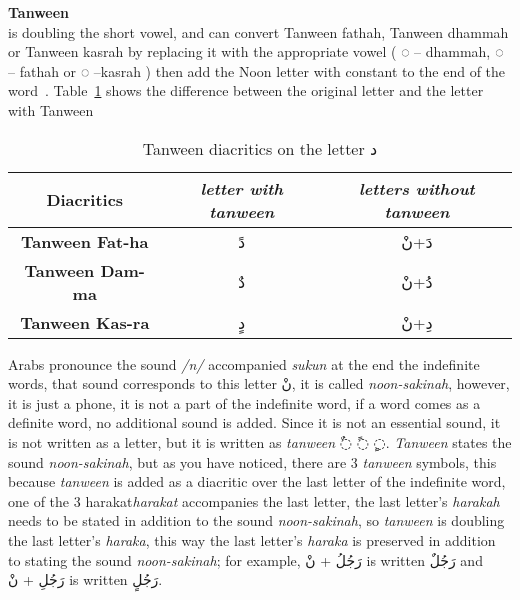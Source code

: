 \begin{definition}\label{def:tanween_definition}
  \textbf{Tanween} \hfill \\
  is doubling the short vowel, and can convert
Tanween fathah, Tanween dhammah or Tanween kasrah by
replacing it with the appropriate vowel ( ُ◌ – dhammah, َ◌ –
fathah or ِ◌ –kasrah ) then add the Noon letter with constant to the end of the word~\cite{Alnagdawi2013}. Table~\ref{tables:Tanween_dal}
shows the difference between the original letter and the letter with Tanween

\begin{table}[!t]
	\centering
	\begin{tabular}{c c c}
		\toprule
		\textbf{\small{Diacritics}} & \small{\textit{letter with tanween }} & \small{\textit{letters without tanween}} \\
		\midrule

          \textbf{\small{Tanween Fat-ha}}  & \textarabic{دً} &  \textarabic{دَ+نْ}\\
          \textbf{\small{Tanween Dam-ma}}  & \textarabic{دٌ} &  \textarabic{دُ+نْ}\\
          \textbf{\small{Tanween Kas-ra}}  & \textarabic{دٍ} &  \textarabic{دِ+نْ}\\


		\bottomrule
	\end{tabular}
	\caption{Tanween diacritics on the letter  \textarabic{ د }} \label{tables:Tanween_dal}
\end{table}


\end{definition}

 Arabs pronounce the sound \textit{/n/} accompanied \textit{sukun} at the end the indefinite words, that sound corresponds to this
letter \textarabic{نْ}, it is called \textit{noon-sakinah}, however, it is
just a phone, it is not a part of the indefinite word, if a word comes as a
definite word, no additional sound is added. Since it is not an essential sound,
it is not written as a letter, but it is written as  \textit{tanween}
\textarabic{◌ٌ ◌ً ◌ٍ}.
\textit{Tanween} states the sound \textit{noon-sakinah}, but as you have noticed,
there are 3 \textit{tanween} symbols, this because  \textit{tanween} is added as
a diacritic over the last letter of the indefinite word, one of the 3 harakat\textit{harakat} accompanies the last letter, the last letter's \textit{harakah}
needs to be stated in addition to the sound \textit{noon-sakinah}, so
\textit{tanween} is doubling the last letter's \textit{haraka}, this way the last
letter's \textit{haraka} is preserved in addition to stating the sound
\textit{noon-sakinah}; for example, \textarabic{رَجُلُ + نْ} is written
\textarabic{رَجُلٌ} and  \textarabic{رَجُلِ + نْ} is written \textarabic{رَجُلٍ}.


